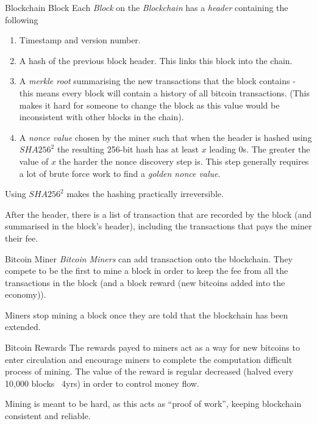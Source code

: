 \documentclass[11pt,a4paper]{article}
\begin{document}
  \begin{definition}{Blockchain Block}
    Each \textit{Block} on the \textit{Blockchain} has a \textit{header} containing the following
    \begin{enumerate}
      \item Timestamp and version number.
      \item A hash of the previous block header. This links this block into the chain.
      \item A \textit{merkle root} summarising the new transactions that the block contains - this means every block will contain a history of all bitcoin transactions. (This makes it hard for someone to change the block as this value would be inconsistent with other blocks in the chain).
      \item A \textit{nonce value} chosen by the miner such that when the header is hashed using $SHA256^2$ the resulting 256-bit hash has at least $x$ leading 0s. The greater the value of $x$ the harder the nonce discovery step is. This step generally requires a lot of brute force work to find a \textit{golden nonce value}.
    \end{enumerate}
    \par Using $SHA256^2$ makes the hashing practically irreversible.
    \par After the header, there is a list of transaction that are recorded by the block (and summarised in the block's header), including the transactions that pays the miner their fee.
  \end{definition}

  \begin{definition}{Bitcoin Miner}
    \textit{Bitcoin Miners} can add transaction onto the blockchain. They compete to be the first to mine a block in order to keep the fee from all the transactions in the block (and a block reward (new bitcoins added into the economy)).
    \par Miners stop mining a block once they are told that the blockchain has been extended.
  \end{definition}

  \begin{definition}{Bitcoin Rewards}
    The rewards payed to miners act as a way for new bitcoins to enter circulation and encourage miners to complete the computation difficult process of mining. The value of the reward is regular decreased (halved every 10,000 blocks ~4yrs) in order to control money flow.
    \par Mining is meant to be hard, as this acts as ``proof of work'', keeping blockchain consistent and reliable.
  \end{definition}
\end{document}
